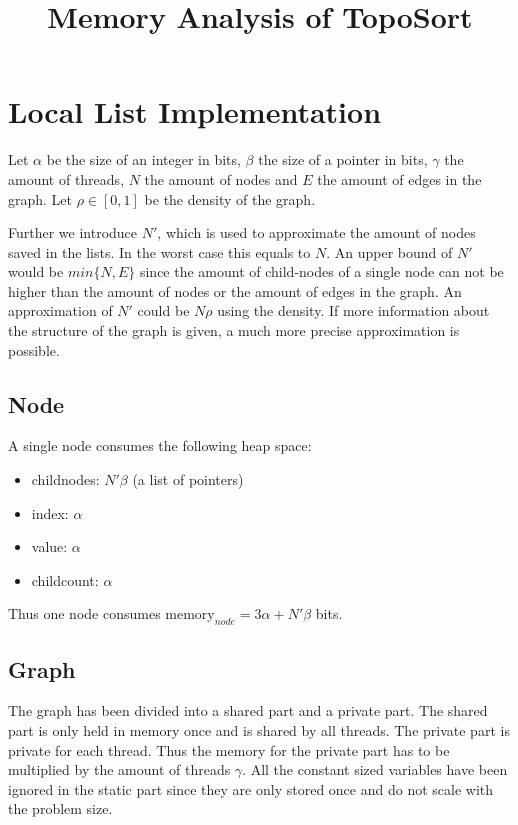 \documentclass[11pt]{article}
\begin{document}
\title{Memory Analysis of TopoSort}

\maketitle

\section{Local List Implementation}

Let $\alpha$ be the size of an integer in bits, $\beta$ the size of a pointer in bits, $\gamma$ the amount of threads, $N$ the amount of nodes and $E$ the amount of edges in the graph. Let $\rho \in [0,1]$ be the density of the graph.

Further we introduce $N'$, which is used to approximate the amount of nodes saved in the lists. In the worst case this equals to $N$. An upper bound of $N'$ would be $min\{N,E\}$ since the amount of child-nodes of a single node can not be higher than the amount of nodes or the amount of edges in the graph. An approximation of $N'$ could be $N\rho$ using the density. If more information about the structure of the graph is given, a much more precise approximation is possible.



\subsection{Node}
A single node consumes the following heap space:

\begin{itemize}
\item childnodes: $N' \beta$ (a list of pointers)
\item index: $\alpha$
\item value: $\alpha$
\item childcount: $\alpha$
\end{itemize}
Thus one node consumes $\textrm{memory}_{node} = 3\alpha + N'\beta$ bits.

\subsection{Graph}
The graph has been divided into a shared part and a private part. The shared part is only held in memory once and is shared by all threads. The private part is private for each thread. Thus the memory for the private part has to be multiplied by the amount of threads $\gamma$. All the constant sized variables have been ignored in the static part since they are only stored once and do not scale with the problem size.
\end{document}

